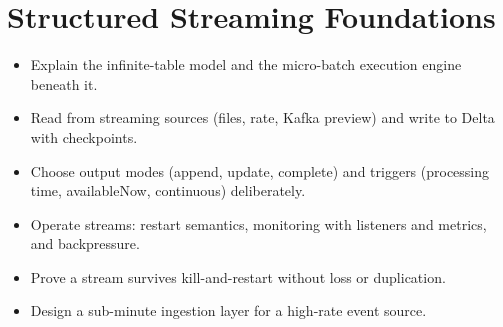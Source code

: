 \chapter{Structured Streaming Foundations}
%
%
\begin{objectives}
\begin{itemize}
    \item Explain the infinite-table model and the micro-batch execution engine beneath it.
    \item Read from streaming sources (files, rate, Kafka preview) and write to Delta with checkpoints.
    \item Choose output modes (append, update, complete) and triggers (processing time, availableNow, continuous) deliberately.
    \item Operate streams: restart semantics, monitoring with listeners and metrics, and backpressure.
    \item Prove a stream survives kill-and-restart without loss or duplication.
    \item Design a sub-minute ingestion layer for a high-rate event source.
\end{itemize}
\end{objectives}

